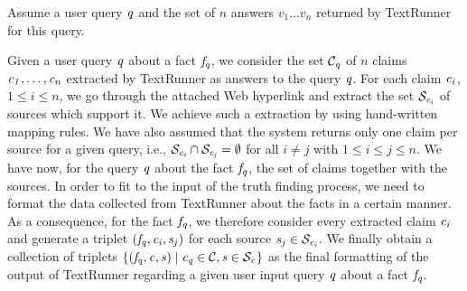 Assume a user query $\mathit{q}$ and the set of $n$ answers $v_1\ldots v_n$ returned by TextRunner for this query.

Given a user query $\mathit{q}$ about a fact $\mathit{f}_{\mathit{q}}$, we consider the set $\mathcal{C}_{\mathit{q}}$ 
of $n$ claims $\mathit{c_{1}}, \ldots, \mathit{c_{n}}$ extracted by TextRunner as answers to the query $\mathit{q}$.
For each claim $\mathit{c_{i}}$, $1\leq i\leq n$, we go through the attached Web hyperlink and extract the set
$\mathcal{S}_{\mathit{c_{i}}}$ of sources which support it. We achieve such a extraction by using hand-written mapping 
rules. We have also assumed that the system returns only one claim per source for a given query, i.e., $\mathcal{S}_{\mathit{c_{i}}}
\cap \mathcal{S}_{\mathit{c_{j}}}=\emptyset$ for all $i\neq j$ with $1\leq i\leq j\leq n$. We have now, for the query
$\mathit{q}$ about the fact $\mathit{f}_{\mathit{q}}$, the set of claims together with the sources. In order to fit to 
the input of the truth finding process, we need to format the data collected from TextRunner about the 
facts in a certain manner. As a consequence, for the fact $\mathit{f}_{\mathit{q}}$, we therefore consider every extracted 
claim $\mathit{c_{i}}$ and generate a triplet $(\mathit{f}_{\mathit{q}}, \mathit{c_{i}}, \mathit{s}_{j})$ for each source $\mathit{s}_{j}\in \mathcal{S}_{\mathit{c_{i}}}$.
We finally obtain a collection of triplets $\{(\mathit{f}_{\mathit{q}}, \mathit{c_{}}, \mathit{s}_{})\mid \mathit{c_{\mathit{q}}}\in \mathcal{C}, \mathit{s}_{} \in \mathcal{S}_{\mathit{c_{}}}\}$ 
as the final formatting of the output of TextRunner regarding a given user input query $\mathit{q}$ about a fact $\mathit{f}_{\mathit{q}}$. 




